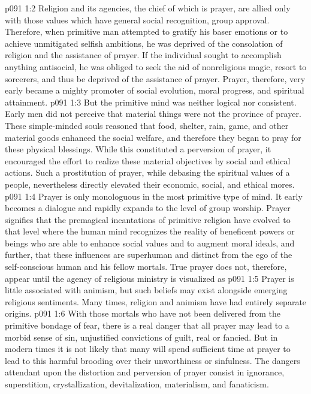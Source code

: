\pc \vs p091 1:2 Religion and its agencies, the chief of which is prayer, are allied only with those values which have general social recognition, group approval. Therefore, when primitive man attempted to gratify his baser emotions or to achieve unmitigated selfish ambitions, he was deprived of the consolation of religion and the assistance of prayer. If the individual sought to accomplish anything antisocial, he was obliged to seek the aid of nonreligious magic, resort to sorcerers, and thus be deprived of the assistance of prayer. Prayer, therefore, very early became a mighty promoter of social evolution, moral progress, and spiritual attainment.
\vs p091 1:3 But the primitive mind was neither logical nor consistent. Early men did not perceive that material things were not the province of prayer. These simple\hyp{}minded souls reasoned that food, shelter, rain, game, and other material goods enhanced the social welfare, and therefore they began to pray for these physical blessings. While this constituted a perversion of prayer, it encouraged the effort to realize these material objectives by social and ethical actions. Such a prostitution of prayer, while debasing the spiritual values of a people, nevertheless directly elevated their economic, social, and ethical mores.
\vs p091 1:4 Prayer is only monologuous in the most primitive type of mind. It early becomes a dialogue and rapidly expands to the level of group worship. Prayer signifies that the premagical incantations of primitive religion have evolved to that level where the human mind recognizes the reality of beneficent powers or beings who are able to enhance social values and to augment moral ideals, and further, that these influences are superhuman and distinct from the ego of the self\hyp{}conscious human and his fellow mortals. True prayer does not, therefore, appear until the agency of religious ministry is visualized as \plusone
\pc \vs p091 1:5 Prayer is little associated with animism, but such beliefs may exist alongside emerging religious sentiments. Many times, religion and animism have had entirely separate origins.
\pc \vs p091 1:6 With those mortals who have not been delivered from the primitive bondage of fear, there is a real danger that all prayer may lead to a morbid sense of sin, unjustified convictions of guilt, real or fancied. But in modern times it is not likely that many will spend sufficient time at prayer to lead to this harmful brooding over their unworthiness or sinfulness. The dangers attendant upon the distortion and perversion of prayer consist in ignorance, superstition, crystallization, devitalization, materialism, and fanaticism.
